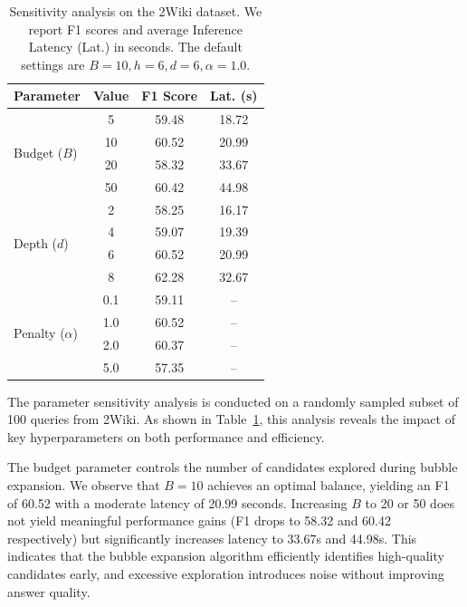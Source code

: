 \begin{table}[h]
    \centering
    \caption{Sensitivity analysis on the 2Wiki dataset. We report F1 scores and average Inference Latency (Lat.) in seconds. The default settings are $B=10, h=6, d=6, \alpha=1.0$.}
    \label{tab:sensitivity}
    \renewcommand{\arraystretch}{1.1}
    \setlength{\tabcolsep}{8pt}
    \begin{tabular}{lccc}
    \toprule
    \textbf{Parameter} & \textbf{Value} & \textbf{F1 Score} & \textbf{Lat. (s)} \\
    \midrule
    \multirow{4}{*}{Budget ($B$)}
      & 5  & 59.48 & 18.72 \\
      & 10 & 60.52 & 20.99 \\
      & 20 & 58.32 & 33.67 \\
      & 50 & 60.42 & 44.98 \\
    \midrule
    \multirow{4}{*}{Depth ($d$)}
      & 2 & 58.25 & 16.17 \\
      & 4 & 59.07 & 19.39 \\
      & 6 & 60.52 & 20.99 \\
      & 8 & 62.28 & 32.67 \\
    \midrule
    \multirow{4}{*}{Penalty ($\alpha$)}
      & 0.1 & 59.11 & -- \\
      & 1.0 & 60.52 & -- \\
      & 2.0 & 60.37 & -- \\
      & 5.0 & 57.35 & -- \\
    \bottomrule
    \end{tabular}
\end{table}


The parameter sensitivity analysis is conducted on a randomly sampled subset of 100 queries from 2Wiki. As shown in Table~\ref{tab:sensitivity}, this analysis reveals the impact of key hyperparameters on both performance and efficiency.

 The budget parameter controls the number of candidates explored during bubble expansion. We observe that $B=10$ achieves an optimal balance, yielding an F1 of 60.52 with a moderate latency of 20.99 seconds. Increasing $B$ to 20 or 50 does not yield meaningful performance gains (F1 drops to 58.32 and 60.42 respectively) but significantly increases latency to 33.67s and 44.98s. This indicates that the bubble expansion algorithm efficiently identifies high-quality candidates early, and excessive exploration introduces noise without improving answer quality.

